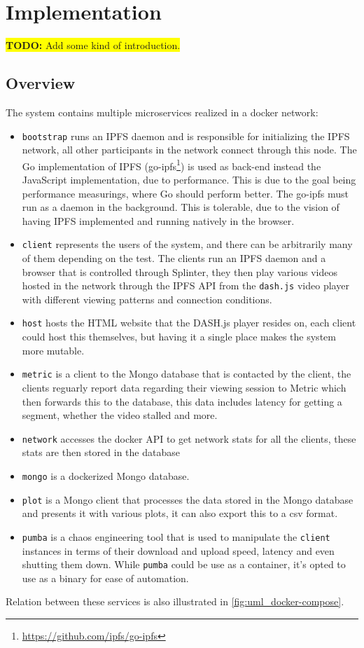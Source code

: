 \chapter{Implementation}
\label{cha:implementation}

\colorbox{yellow}{\textbf{TODO:} Add some kind of introduction.}


\section{Overview}
\label{sec:impl-overview}
The system  contains multiple microservices realized in a docker network:
\begin{itemize}
    \item \texttt{bootstrap} runs an IPFS daemon and is responsible for initializing the IPFS network, all other participants in the network connect through this node. 
    The Go implementation of \acs{IPFS} (go-ipfs\footnote{\url{https://github.com/ipfs/go-ipfs}}) is used as back-end instead the JavaScript implementation, due to performance. This is due to the goal being performance measurings, where Go should perform better. The go-ipfs must run as a daemon in the background. This is tolerable, due to the vision of having IPFS implemented and running natively in the browser.
    \item \texttt{client} represents the users of the system, and there can be arbitrarily many of them depending on the test. The clients run an IPFS daemon and a browser that is controlled through Splinter, they then play various videos hosted in the network through the IPFS \acs{API} from the \texttt{dash.js} video player with different viewing patterns and connection conditions.
    \item \texttt{host} hosts the \ac{HTML} website that the DASH.js player resides on, each client could host this themselves, but having it a single place makes the system more mutable.
    \item \texttt{metric} is a client to the Mongo database that is contacted by the client, the clients reguarly report data regarding their viewing session to Metric which then forwards this to the database, this data includes latency for getting a segment, whether the video stalled and more.
    \item \texttt{network} accesses the docker \acs{API} to get network stats for all the clients, these stats are then stored in the database
    \item \texttt{mongo} is a dockerized Mongo database.
    \item \texttt{plot} is a Mongo client that processes the data stored in the Mongo database and presents it with various plots, it can also export this to a csv format.
    \item \texttt{pumba} is a chaos engineering tool that is used to manipulate the \texttt{client} instances in terms of their download and upload speed, latency and even shutting them down. While \texttt{pumba} could be use as a container, it's opted to use as a binary for ease of automation. 
\end{itemize}
Relation between these services is also illustrated in \autoref{fig:uml_docker-compose}.

